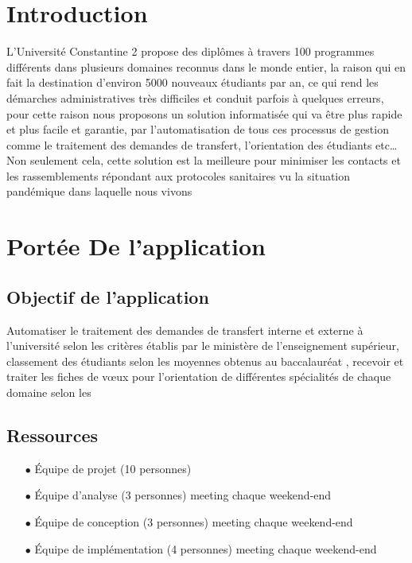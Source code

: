 
\section{Introduction}
L'Université Constantine 2 propose des diplômes à travers 100 programmes
différents dans plusieurs domaines reconnus dans le monde entier, la raison qui
en fait la destination d'environ 5000 nouveaux étudiants par an, ce qui rend
les démarches administratives très difficiles et conduit parfois à quelques
erreurs, pour cette raison nous proposons un solution informatisée qui va être
plus rapide et plus facile et garantie, par l'automatisation de tous ces
processus de gestion comme le traitement des demandes de transfert,
l'orientation des étudiants etc\ldots \\ Non seulement cela, cette solution est
la meilleure pour minimiser les contacts et les rassemblements répondant aux
protocoles sanitaires vu la situation pandémique dans laquelle nous vivons

\section{Portée De l'application}

\subsection{Objectif de l'application}
Automatiser le traitement des demandes de transfert interne et externe à
l’université selon les critères établis par le ministère de l’enseignement
supérieur, classement des étudiants selon les moyennes obtenus au baccalauréat
, recevoir et traiter les fiches de vœux pour l’orientation de différentes
spécialités de chaque domaine selon les

\subsection{Ressources}
\begin{itemize}
    \item[$\bullet$] Équipe de projet (10 personnes)
    \item[$\bullet$] Équipe d’analyse (3 personnes) meeting chaque weekend-end
    \item[$\bullet$] Équipe de conception (3 personnes) meeting chaque weekend-end
    \item[$\bullet$] Équipe de implémentation (4 personnes) meeting chaque weekend-end
\end{itemize}

